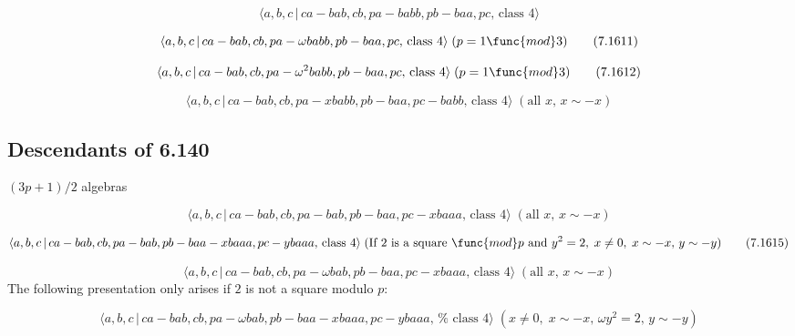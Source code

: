 \documentclass[10pt]{article}
\begin{document}
\begin{equation}
\langle a,b,c\,|\,ca-bab,cb,pa-babb,pb-baa,pc,\,\text{class }4\rangle 
\tag{7.1610}
\end{equation}

\begin{equation}
\langle a,b,c\,|\,ca-bab,cb,pa-\omega babb,pb-baa,pc,\,\text{class }4\rangle
\;(p=1\func{mod}3)  \tag{7.1611}
\end{equation}

\begin{equation}
\langle a,b,c\,|\,ca-bab,cb,pa-\omega ^{2}babb,pb-baa,pc,\,\text{class }%
4\rangle \;(p=1\func{mod}3)  \tag{7.1612}
\end{equation}

\begin{equation}
\langle a,b,c\,|\,ca-bab,cb,pa-xbabb,pb-baa,pc-babb,\,\text{class }4\rangle
\;(\text{all }x,\,x\sim -x)  \tag{7.1613}
\end{equation}

\subsection{Descendants of 6.140}

$(3p+1)/2$ algebras

\begin{equation}
\langle a,b,c\,|\,ca-bab,cb,pa-bab,pb-baa,pc-xbaaa,\,\text{class }4\rangle
\;(\text{all }x,\,x\sim -x)  \tag{7.1614}
\end{equation}

\begin{equation}
\langle a,b,c\,|\,ca-bab,cb,pa-bab,pb-baa-xbaaa,pc-ybaaa,\,\text{class }%
4\rangle \;(\text{If 2 is a square }\func{mod}p\text{ and }y^{2}=2,\;x\neq
0,\;x\sim -x,\,y\sim -y)  \tag{7.1615}
\end{equation}

\begin{equation}
\langle a,b,c\,|\,ca-bab,cb,pa-\omega bab,pb-baa,pc-xbaaa,\,\text{class }%
4\rangle \;(\text{all }x,\,x\sim -x)  \tag{7.1616}
\end{equation}%
The following presentation only arises if $2$ is not a square modulo $p$:

\begin{equation}
\langle a,b,c\,|\,ca-bab,cb,pa-\omega bab,pb-baa-xbaaa,pc-ybaaa,\,\text{%
class }4\rangle \;(x\neq 0,\;x\sim -x,\,\omega y^{2}=2,\,y\sim -y) 
\tag{7.1617}
\end{equation}
\end{document}
